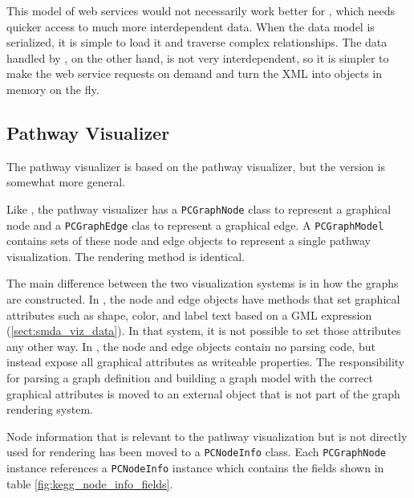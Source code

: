 This model of web services would not necessarily work better for \mawapp,
which needs quicker access to much more interdependent data. When the data model
is serialized, it is simple to load it and traverse complex relationships. The
data handled by \keggapp, on the other hand, is not very interdependent, so
it is simpler to make the web service requests on demand and turn the XML into
objects in memory on the fly.

\subsection{Pathway Visualizer}
\label{sect:kegg_impl_graph_view}

The \keggapp pathway visualizer is based on the \mawapp pathway visualizer, but
the \keggapp version is somewhat more general.

Like \mawapp, the \keggapp pathway visualizer has a \texttt{PCGraphNode} class
to represent a graphical node and a \texttt{PCGraphEdge} clas to represent a
graphical edge. A \texttt{PCGraphModel} contains sets of these node and edge
objects to represent a single pathway visualization. The rendering method is
identical.

The main difference between the two visualization systems is in how the graphs
are constructed. In \mawapp, the node and edge objects have methods that set
graphical attributes such as shape, color, and label text based on a GML
expression (\ref{sect:smda_viz_data}). In that system, it is not possible to set
those attributes any other way. In \keggapp, the node and edge objects contain
no parsing code, but instead expose all graphical attributes as writeable
properties. The responsibility for parsing a graph definition and building a
graph model with the correct graphical attributes is moved to an external object
that is not part of the graph rendering system.

Node information that is relevant to the pathway visualization but is not
directly used for rendering has been moved to a \texttt{PCNodeInfo} class. Each
\texttt{PCGraphNode} instance references a \texttt{PCNodeInfo} instance which
contains the fields shown in table \ref{fig:kegg_node_info_fields}.

